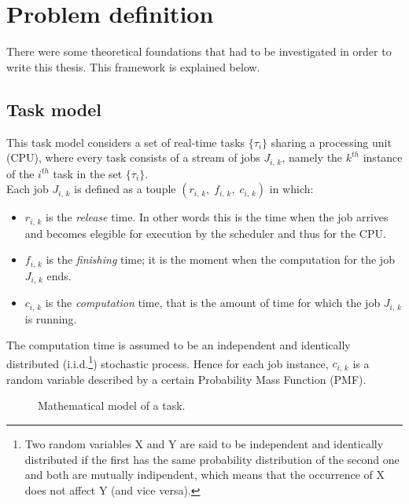 \chapter{Problem definition}\label{chp:model}


There were some theoretical foundations that had to be investigated in order to write this thesis. This framework is explained below. 

\section{Task model}
This task model considers a set of real-time tasks \( \{\tau_{i}\} \) sharing a processing unit (CPU), where every task consists of a stream of jobs \( J_{i,\,k} \), namely the \( k^{th} \) instance of the \( i^{th} \) task in the set \( \{\tau_{i}\} \).\\
Each job \( J_{i,\,k} \) is defined as a touple \( \left(r_{i,\,k}, \;f_{i,\,k}, \;c_{i,\,k}\right) \) in which:
\begin{itemize}
  \item \( r_{i,\,k} \) is the \emph{release} time. In other words this is the time when the job arrives and becomes elegible for execution by the scheduler and thus for the CPU.
  \item \( f_{i,\,k} \) is the \emph{finishing} time; it is the moment when the computation for the job \( J_{i,\,k} \) ends.
  \item \( c_{i,\,k} \) is the \emph{computation} time, that is the amount of time for which the job \( J_{i,\,k} \) is running.
\end{itemize} 

The computation time is assumed to be an independent and identically distributed (i.i.d.\footnote{Two random variables X and Y are said to be independent and identically distributed if the first has the same probability distribution of the second one and both are mutually indipendent, which means that the occurrence of X does not affect Y (and vice versa).}) stochastic process. Hence for each job instance, \( c_{i,\,k} \) is a random variable described by a certain Probability Mass Function (PMF).
\begin{figure}[H]
  \caption{Mathematical model of a task.}
  \label{taskmodel}
\end{figure}

